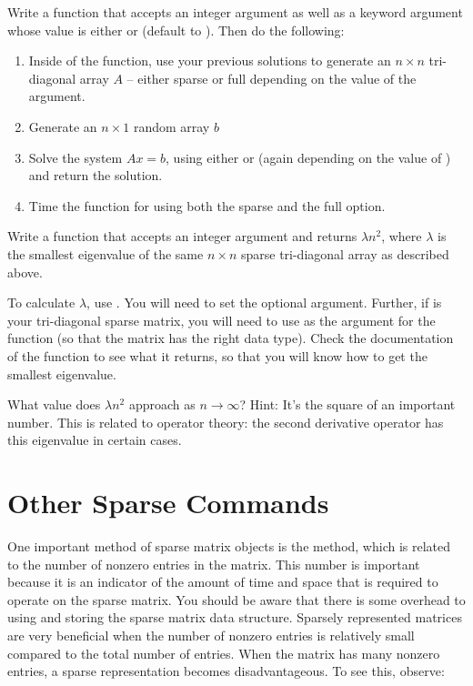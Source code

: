 \begin{problem}
Write a function that accepts an integer argument  as well as a keyword argument  whose value is either  or  (default to ). Then do the following:
\begin{enumerate}
\item Inside of the function, use your previous solutions to generate an $n \times n$ tri-diagonal array $A$ -- either sparse or full depending on the value of the  argument.
\item Generate an $n \times 1$ random array $b$
\item Solve the system $Ax = b$, using either  or 
(again depending on the value of ) and return the solution.
\item Time the function for  using both the sparse and the full option.
\end{enumerate}
\end{problem}

\begin{problem}
Write a function that accepts an integer argument  and returns $\lambda n^2$, where
$\lambda$ is the smallest eigenvalue of the same $n \times n$ sparse tri-diagonal array as described above.

To calculate $\lambda$, use . You will need to set the 
optional argument. Further, if  is your tri-diagonal sparse matrix, you will need to use
 as the argument for the  function (so that the matrix has the right data type).
Check the documentation of the  function to see what it returns, so that you will know how to
get the smallest eigenvalue.

What value does $\lambda n^2$ approach as $n \rightarrow \infty$?
Hint: It's the square of an important number.
This is related to operator theory: the second derivative operator has this eigenvalue in certain cases.
\end{problem}

\section*{Other Sparse Commands}
One important method of sparse matrix objects is the  method, which is related to the number of nonzero entries in the matrix. This number is important because it is an indicator of the amount of time and space that is required to operate on the sparse matrix.
You should be aware that there is some overhead to using and storing the sparse matrix data structure. Sparsely represented matrices are very beneficial when the number of nonzero entries is relatively small compared to the total number of entries.
When the matrix has many nonzero entries, a sparse representation becomes disadvantageous.
To see this, observe: 

